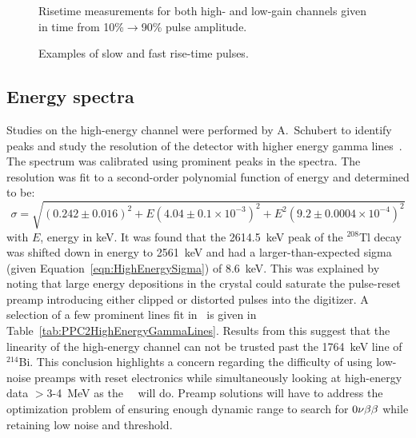 				\begin{figure}
					\centering
					\caption[Rise-time measurements for high- and low-gain channels]
					{Risetime measurements for both high- and low-gain channels given in time from 10\%$\to$90\% 
					pulse amplitude.}
					\label{fig:PPC2RisetimeCalculations}
				\end{figure}		
	
				\begin{figure}
					\centering
					\caption[Examples of slow and fast rise-time pulses]
					{Examples of slow and fast rise-time pulses.}
					\label{fig:PPC2RisetimeExamplePulses}
				\end{figure}		
			
	    	\subsection{Energy spectra}
		\label{sec:DeploymentPPC2SoudanAnalysisEnergySpectra}    	
			
	Studies on the high-energy channel were performed by A.~Schubert to identify peaks and study the resolution of the detector with higher energy gamma lines~\cite{Schubert:2009ff}.  The spectrum was calibrated using prominent peaks in the spectra.  The resolution was fit to a second-order polynomial function of energy and determined to be:
				\begin{equation}
					\sigma = \sqrt{(0.242 \pm 0.016)^{2} +  E (4.04 \pm 0.1 \times 10^{-3})^{2} + E^{2} (9.2 \pm 0.0004 \times 10^{-4})^{2}} 
				\label{eqn:HighEnergySigma}
				\end{equation}			
with $E$, energy in keV.  It was found that the 2614.5~keV peak of the $^{208}$Tl decay was shifted down in energy to 2561~keV and had a larger-than-expected sigma (given Equation~\ref{eqn:HighEnergySigma}) of 8.6~keV.  This was explained by noting that large energy depositions in the crystal could saturate the pulse-reset preamp introducing either clipped or distorted pulses into the digitizer.  A selection of a few prominent lines fit in~\cite{Schubert:2009ff} is given in Table~\ref{tab:PPC2HighEnergyGammaLines}.  Results from this suggest that the linearity of the high-energy channel can not be trusted past the 1764~keV line of $^{214}$Bi.  This conclusion highlights a concern regarding the difficulty of using low-noise preamps with reset electronics while simultaneously looking at high-energy data $>$3-4~MeV as the \MJ~\minmod~will do.  Preamp solutions will have to address the optimization problem of ensuring enough dynamic range to search for $0 \nu \beta \beta$ while retaining low noise and threshold.  
	
